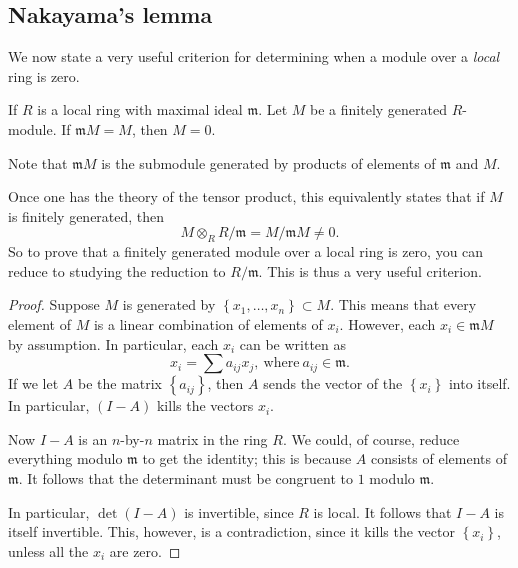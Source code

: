 \subsection{Nakayama's lemma}

We now state a very useful criterion for determining when a module over a
\emph{local} ring is zero.


\begin{lemma} If $R$ is a local ring with maximal ideal
$\mathfrak{m}$. Let $M$ be a finitely generated $R$-module.  If
$\mathfrak{m}M = M$, then $M = 0$.
\end{lemma} 

Note that $\mathfrak{m}M$ is the submodule generated by products of
elements of $\mathfrak{m}$ and $M$. 

\begin{remark} 
Once one has the theory of the tensor product, this equivalently states that if $M$ is finitely generated, then
\[ M \otimes_R R/\mathfrak{m} = M/\mathfrak{m}M \neq 0.  \]
So to prove that a finitely generated module over a local ring is zero, you
can reduce to studying the reduction to $R/\mathfrak{m}$. This is thus a very
useful criterion.
\end{remark} 


\begin{proof} 
Suppose $M$ is generated by $\left\{x_1, \dots, x_n\right\} \subset M$. This
means that every element of $M$ is  a linear combination of elements of
$x_i$. However, each $x_i \in \mathfrak{m}M$ by assumption. In particular, each
$x_i$ can be written as
\[ x_i = \sum a_{ij} x_j, \ \mathrm{where} \ a_{ij} \in \mathfrak{m}.  \]
If we let $A$ be the matrix $\left\{a_{ij}\right\}$, then $A$ sends the
vector of the $\left\{x_i\right\}$ into itself. In particular, $(I-A)$ kills
the vectors $x_i$.  

Now $I-A$ is an $n$-by-$n$ matrix in the ring $R$. We could, of course,
reduce everything modulo $\mathfrak{m}$ to get the identity; this is
because $A$ consists of elements of $\mathfrak{m}$. It follows that the
determinant must be congruent to $1$ modulo $\mathfrak{m}$. 

In particular, $\det (I - A)$ is invertible, since $R$ is local.  It
follows that $I-A$ is itself invertible. This, however, is  a
contradiction, since it kills the vector $\left\{x_i\right\}$, unless all the
$x_i $ are zero.  
\end{proof} 

